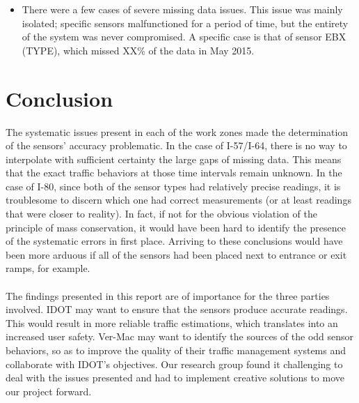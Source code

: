 \documentclass[11pt]{article}
\begin{document}
\begin{description}
\begin{itemize}
			\item There were a few cases of severe missing data issues. This issue was mainly isolated; specific sensors malfunctioned for a period of time, but the entirety of the system was never compromised. A specific case is that of sensor EBX (TYPE), which missed XX\% of the data in May 2015.
			
		\end{itemize}
\end{description}


\section{Conclusion}
The systematic issues present in each of the work zones made the determination of the sensors' accuracy problematic. In the case of I-57/I-64, there is no way to interpolate with sufficient certainty the large gaps of missing data. This means that the exact traffic behaviors at those  time intervals remain unknown. In the case of I-80, since both of the sensor types had relatively precise readings, it is troublesome to discern which one had correct measurements (or at least readings that were closer to reality). In fact, if not for the obvious violation of the principle of mass conservation, it would have been hard to identify the presence of the systematic errors in first place. Arriving to these conclusions would have been more arduous if all of the sensors had been placed next to entrance or exit ramps, for example.
\\
\\
The findings presented in this report are of importance for the three parties involved. IDOT may want to ensure that the sensors produce accurate readings. This would result in more reliable traffic estimations, which translates into an increased user safety. Ver-Mac may want to identify the sources of the odd sensor behaviors, so as to improve the quality of their traffic management systems and collaborate with IDOT's objectives. Our research group found it challenging to deal with the issues presented and had to implement creative solutions to move our project forward.
\end{document}
